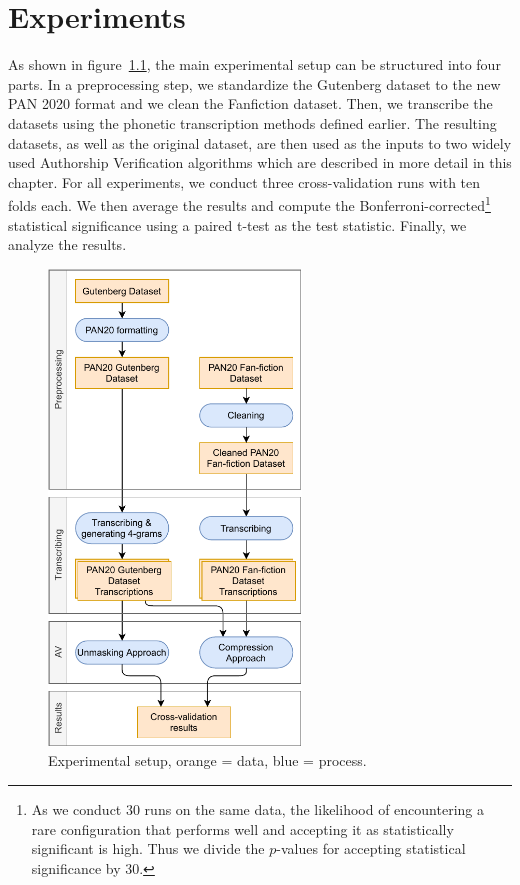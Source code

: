 \chapter{Experiments}\label{experiments}
As shown in figure~\ref{fig:process}, the main experimental setup can be structured into four parts.
In a preprocessing step, we standardize the Gutenberg dataset to the new PAN 2020 format and we clean the Fanfiction dataset.
Then, we transcribe the datasets using the phonetic transcription methods defined earlier.
The resulting datasets, as well as the original dataset, are then used as the inputs to two widely used Authorship Verification algorithms which are described in more detail in this chapter.
For all experiments, we conduct three cross-validation runs with ten folds each.
We then average the results and compute the Bonferroni-corrected\footnote{As we conduct 30 runs on the same data, the likelihood of encountering a rare configuration that performs well and accepting it as statistically significant is high. Thus we divide the $p$-values for accepting statistical significance by 30.} statistical significance using a paired t-test as the test statistic.
Finally, we analyze the results.
\begin{figure}
  \centering
  \includegraphics[width=0.6\textwidth]{figures/process}
  \caption{Experimental setup, orange = data, blue = process.}
  \label{fig:process}
\end{figure}

